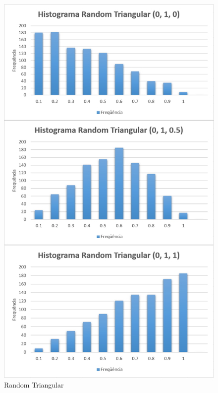 \begin{figure}[H]
	\centering
	\includegraphics[scale=0.55]{Figuras/RandomTriangular-White.png}
	\caption{Random Triangular}
	\label{fig:RandomTriangular-White}
\end{figure}

